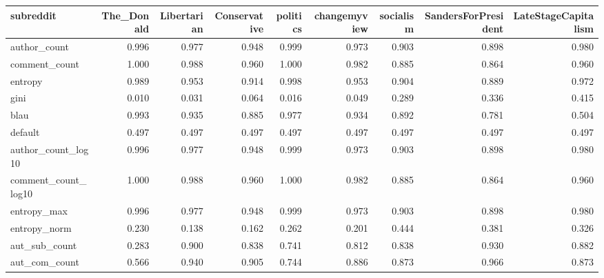 \begin{table}
\centering
\begin{tabular}{lrrrrrrrr}
\toprule
subreddit &  The\_Donald &  Libertarian &  Conservative &  politics &  changemyview &  socialism &  SandersForPresident &  LateStageCapitalism \\
\midrule
author\_count        &       0.996 &        0.977 &         0.948 &     0.999 &         0.973 &      0.903 &                0.898 &                0.980 \\
comment\_count       &       1.000 &        0.988 &         0.960 &     1.000 &         0.982 &      0.885 &                0.864 &                0.960 \\
entropy             &       0.989 &        0.953 &         0.914 &     0.998 &         0.953 &      0.904 &                0.889 &                0.972 \\
gini                &       0.010 &        0.031 &         0.064 &     0.016 &         0.049 &      0.289 &                0.336 &                0.415 \\
blau                &       0.993 &        0.935 &         0.885 &     0.977 &         0.934 &      0.892 &                0.781 &                0.504 \\
default             &       0.497 &        0.497 &         0.497 &     0.497 &         0.497 &      0.497 &                0.497 &                0.497 \\
author\_count\_log10  &       0.996 &        0.977 &         0.948 &     0.999 &         0.973 &      0.903 &                0.898 &                0.980 \\
comment\_count\_log10 &       1.000 &        0.988 &         0.960 &     1.000 &         0.982 &      0.885 &                0.864 &                0.960 \\
entropy\_max         &       0.996 &        0.977 &         0.948 &     0.999 &         0.973 &      0.903 &                0.898 &                0.980 \\
entropy\_norm        &       0.230 &        0.138 &         0.162 &     0.262 &         0.201 &      0.444 &                0.381 &                0.326 \\
aut\_sub\_count       &       0.283 &        0.900 &         0.838 &     0.741 &         0.812 &      0.838 &                0.930 &                0.882 \\
aut\_com\_count       &       0.566 &        0.940 &         0.905 &     0.744 &         0.886 &      0.873 &                0.966 &                0.873 \\

\end{tabular}
\end{table}
